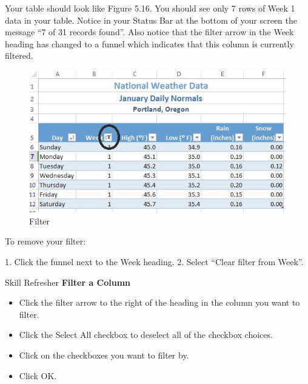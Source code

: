 Your table should look like Figure 5.16. You should see only 7 rows of Week 1 data in your table.
Notice in your Status Bar at the bottom of your screen the message “7 of 31 records found”. Also
notice that the filter arrow in the Week heading has changed to a funnel which indicates that this
column is currently filtered.


\begin{figure}[H]
	\centering
	\includegraphics[width=\maxwidth{.95\linewidth}]{gfx/ch05_fig16}
	\caption{Filter}
	\label{05:fig16}
\end{figure}





To remove your filter:

1. Click the funnel next to the Week heading.
2. Select “Clear filter from Week”.

\begin{center}
	\begin{sklbox}{Skill Refresher}
		\textbf{Filter a Column}
		\\
		\begin{itemize}
			\setlength{\itemsep}{0pt}
			\setlength{\parskip}{0pt}
			\setlength{\parsep}{0pt}

			\item Click the filter arrow to the right of the heading in the column you want to filter.
			\item Click the Select All checkbox to deselect all of the checkbox choices.
			\item Click on the checkboxes you want to filter by.
			\item Click OK.
			
		\end{itemize}
	\end{sklbox}
\end{center}



